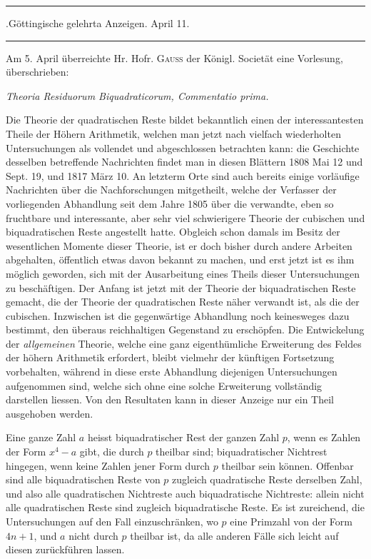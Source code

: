 \clearpage
{}%
\begin{center}
\rule{.82\linewidth}{.35pt}\par
.Göttingische gelehrta Anzeigen. April 11.\par
\rule{.82\linewidth}{.35pt}
\end{center}
Am 5. April überreichte Hr. Hofr. \textsc{Gauss} der Königl. Societät eine Vorlesung, überschrieben:
\begin{center}\itshape
Theoria Residuorum Biquadraticorum, Commentatio prima.
\end{center}

Die Theorie der quadratischen Reste bildet bekanntlich einen der interessantesten Theile der Höhern Arithmetik, welchen man jetzt nach vielfach wiederholten Untersuchungen als vollendet und abgeschlossen betrachten kann: die Geschichte desselben betreffende Nachrichten findet man in diesen Blättern 1808 Mai 12 und Sept. 19, und 1817 März 10. An letzterm Orte sind auch bereits einige vorläufige Nachrichten über die Nachforschungen mitgetheilt, welche der Verfasser der vorliegenden Abhandlung seit dem Jahre 1805 über die verwandte, eben so fruchtbare und interessante, aber sehr viel schwierigere Theorie der cubischen und biquadratischen Reste angestellt hatte. Obgleich schon damals im Besitz der wesentlichen Momente dieser Theorie, ist er doch bisher durch andere Arbeiten abgehalten, öffentlich etwas davon bekannt zu machen, und erst jetzt ist es ihm möglich geworden, sich mit der Ausarbeitung eines Theils dieser Untersuchungen zu beschäftigen. Der Anfang ist jetzt mit der Theorie der biquadratischen Reste gemacht, die der Theorie der quadratischen Reste näher verwandt ist, als die der cubischen. Inzwischen ist die gegenwärtige Abhandlung
%
noch keinesweges dazu bestimmt, den überaus reichhaltigen Gegenstand zu erschöpfen. Die Entwickelung der \emph{allgemeinen} Theorie, welche eine ganz eigenthümliche Erweiterung des Feldes der höhern Arithmetik erfordert, bleibt vielmehr der künftigen Fortsetzung vorbehalten, während in diese erste Abhandlung diejenigen Untersuchungen aufgenommen sind, welche sich ohne eine solche Erweiterung vollständig darstellen liessen. Von den Resultaten kann in dieser Anzeige nur ein Theil ausgehoben werden.

Eine ganze Zahl $a$ heisst biquadratischer Rest der ganzen Zahl $p$, wenn es Zahlen der Form $x^4-a$ gibt, die durch $p$ theilbar sind; biquadratischer Nichtrest hingegen, wenn keine Zahlen jener Form durch $p$ theilbar sein können. Offenbar sind alle biquadratischen Reste von $p$ zugleich quadratische Reste derselben Zahl, und also alle quadratischen Nichtreste auch biquadratische Nichtreste: allein nicht alle quadratischen Reste sind zugleich biquadratische Reste. Es ist zureichend, die Untersuchungen auf den Fall einzuschränken, wo $p$ eine Primzahl von der Form $4n+1$, und $a$ nicht durch $p$ theilbar ist, da alle anderen Fälle sich leicht auf diesen zurückführen lassen.


